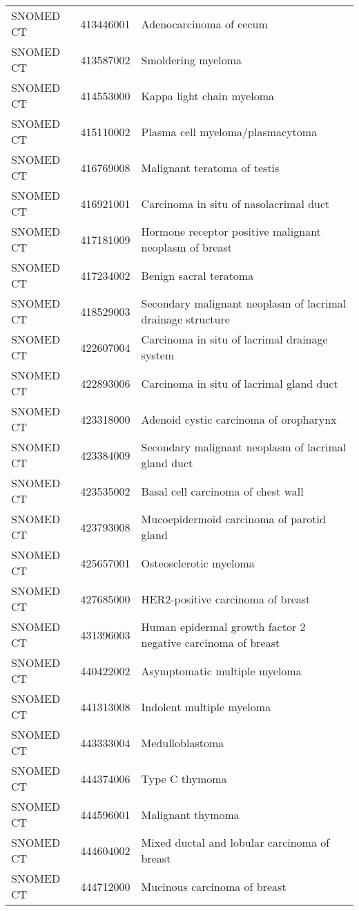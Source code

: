 \begin{longtable}{p{}p{}p{}}
  SNOMED CT & 413446001 & Adenocarcinoma of cecum \\ 
  SNOMED CT & 413587002 & Smoldering myeloma \\ 
  SNOMED CT & 414553000 & Kappa light chain myeloma \\ 
  SNOMED CT & 415110002 & Plasma cell myeloma/plasmacytoma \\ 
  SNOMED CT & 416769008 & Malignant teratoma of testis \\ 
  SNOMED CT & 416921001 & Carcinoma in situ of nasolacrimal duct \\ 
  SNOMED CT & 417181009 & Hormone receptor positive malignant neoplasm of breast \\ 
  SNOMED CT & 417234002 & Benign sacral teratoma \\ 
  SNOMED CT & 418529003 & Secondary malignant neoplasm of lacrimal drainage structure \\ 
  SNOMED CT & 422607004 & Carcinoma in situ of lacrimal drainage system \\ 
  SNOMED CT & 422893006 & Carcinoma in situ of lacrimal gland duct \\ 
  SNOMED CT & 423318000 & Adenoid cystic carcinoma of oropharynx \\ 
  SNOMED CT & 423384009 & Secondary malignant neoplasm of lacrimal gland duct \\ 
  SNOMED CT & 423535002 & Basal cell carcinoma of chest wall \\ 
  SNOMED CT & 423793008 & Mucoepidermoid carcinoma of parotid gland \\ 
  SNOMED CT & 425657001 & Osteosclerotic myeloma \\ 
  SNOMED CT & 427685000 & HER2-positive carcinoma of breast \\ 
  SNOMED CT & 431396003 & Human epidermal growth factor 2 negative carcinoma of breast \\ 
  SNOMED CT & 440422002 & Asymptomatic multiple myeloma \\ 
  SNOMED CT & 441313008 & Indolent multiple myeloma \\ 
  SNOMED CT & 443333004 & Medulloblastoma \\ 
  SNOMED CT & 444374006 & Type C thymoma \\ 
  SNOMED CT & 444596001 & Malignant thymoma \\ 
  SNOMED CT & 444604002 & Mixed ductal and lobular carcinoma of breast \\ 
  SNOMED CT & 444712000 & Mucinous carcinoma of breast \\ 

\end{longtable}
